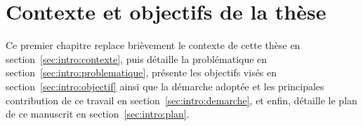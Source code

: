 \chapter{Contexte et objectifs de la thèse}
\chaptertoc

Ce premier chapitre replace brièvement le contexte de cette thèse en section~\ref{sec:intro:contexte}, puis détaille la problématique en section~\ref{sec:intro:problematique}, présente les objectifs visés en section~\ref{sec:intro:objectif} ainsi que la démarche adoptée et les principales contribution de ce travail en section~\ref{sec:intro:demarche}, et enfin, détaille le plan de ce manuscrit en section~\ref{sec:intro:plan}.






